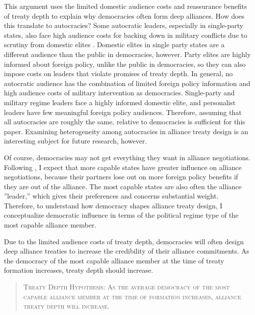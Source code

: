 \documentclass[12pt]{article}
\begin{document}
This argument uses the limited domestic audience costs and reassurance benefits of treaty depth to explain why democracies often form deep alliances. 
How does this translate to autocracies? 
Some autocratic leaders, especially in single-party states, also face high audience costs for backing down in military conflicts due to scrutiny from domestic elites \citep{Weeks2014}.
Domestic elites in single party states are a different audience than the public in democracies, however.  
Party elites are highly informed about foreign policy, unlike the public in democracies, so they can also impose costs on leaders that violate promises of treaty depth. 
In general, no autocratic audience has the combination of limited foreign policy information and high audience costs of military intervention as democracies.
Single-party and military regime leaders face a highly informed domestic elite, and personalist leaders have few meaningful foreign policy audiences. 
Therefore, assuming that all autocracies are roughly the same, relative to democracies is sufficient for this paper. 
Examining heterogeneity among autocracies in alliance treaty design is an interesting subject for future research, however. 


Of course, democracies may not get everything they want in alliance negotiations. 
Following \citep{Mattes2012}, I expect that more capable states have greater influence on alliance negotiations, because their partners lose out on more foreign policy benefits if they are out of the alliance.
The most capable states are also often the alliance ''leader,'' which gives their preferences and concerns substantial weight. 
Therefore, to understand how democracy shapes alliance treaty design, I conceptualize democratic influence in terms of the political regime type of the most capable alliance member. 


Due to the limited audience costs of treaty depth, democracies will often design deep alliance treaties to increase the credibility of their alliance commitments. 
As the democracy of the most capable alliance member at the time of treaty formation increases, treaty depth should increase. 


\begin{quote}
\textsc{Treaty Depth Hypothesis: As the average democracy of the most capable alliance member at the time of formation increases, alliance treaty depth will increase.}
\end{quote} 
\end{document}
